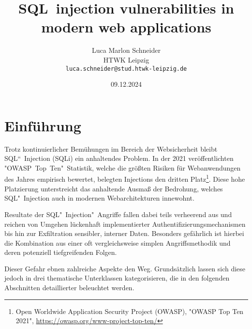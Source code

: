 \documentclass[a4paper,10pt,parskip,twocolumn]{article}
\title{SQL~injection vulnerabilities in modern web applications}
\author{
	\Large Luca Marlon Schneider \\[2mm]
	\normalsize HTWK Leipzig \\
	\texttt{luca.schneider@stud.htwk-leipzig.de}
}
\date{09.12.2024}
\begin{document}


\section{Einführung}

    Trotz kontinuierlicher Bemühungen im Bereich der Websicherheit bleibt SQL“~Injection (SQLi) ein anhaltendes Problem. In der 2021 veröffentlichten "OWASP~Top~Ten"\ Statistik, welche die größten Risiken für Webanwendungen des Jahres empirisch bewertet, belegten Injections den dritten Platz\footnote{Open Worldwide Application Security Project (OWASP), "OWASP Top Ten 2021", \url{https://owasp.org/www-project-top-ten/}}. Diese hohe Platzierung unterstreicht das anhaltende Ausmaß der Bedrohung, welches SQL"~Injection auch in modernen Webarchitekturen innewohnt.\par
    Resultate der SQL"~Injection"~Angriffe fallen dabei teils verheerend aus und reichen von Umgehen 
    lückenhaft implementierter Authentifizierungsmechanismen bis hin zur Exfiltration sensibler, interner Daten. Besonders gefährlich ist hierbei die Kombination aus einer oft vergleichsweise simplen Angriffsmethodik und deren potenziell tiefgreifenden Folgen.\par
    Dieser Gefahr ebnen zahlreiche Aspekte den Weg. Grundsätzlich lassen sich diese jedoch in drei thematische Unterklassen kategorisieren, die in den folgenden Abschnitten detaillierter beleuchtet werden.
\end{document}
